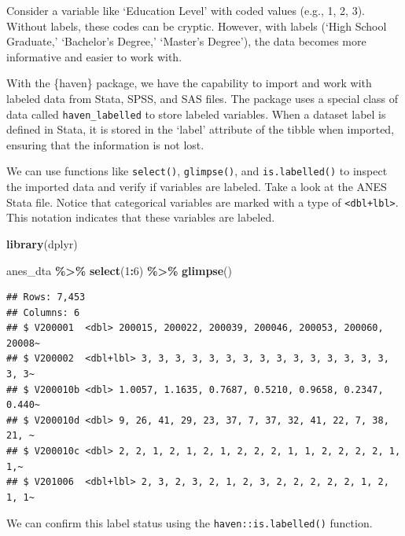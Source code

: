 \documentclass[
]{krantz}
\makeatletter
\newenvironment{Shaded}{\begin{snugshade}}{\end{snugshade}}
\newcommand{\DecValTok}[1]{\textcolor[rgb]{0.06,0.06,0.06}{#1}}
\newcommand{\FunctionTok}[1]{\textcolor[rgb]{0.27,0.27,0.27}{\textbf{#1}}}
\newcommand{\NormalTok}[1]{#1}
\newcommand{\SpecialCharTok}[1]{\textcolor[rgb]{0.43,0.43,0.43}{\textbf{#1}}}
\newenvironment{kframe}{%
\medskip{}
\setlength{\fboxsep}{.8em}
 \def\at@end@of@kframe{}%
 \ifinner\ifhmode%
  \def\at@end@of@kframe{\end{minipage}}%
  \begin{minipage}{\columnwidth}%
 \fi\fi%
 \def\FrameCommand##1{\hskip\@totalleftmargin \hskip-\fboxsep
 \colorbox{shadecolor}{##1}\hskip-\fboxsep
     \hskip-\linewidth \hskip-\@totalleftmargin \hskip\columnwidth}%
 \MakeFramed {\advance\hsize-\width
   \@totalleftmargin\z@ \linewidth\hsize
   \@setminipage}}%
 {\par\unskip\endMakeFramed%
 \at@end@of@kframe}
\renewenvironment{Shaded}{\begin{kframe}}{\end{kframe}}
\makeatother
\begin{document}
Consider a variable like `Education Level' with coded values (e.g., 1, 2, 3). Without labels, these codes can be cryptic. However, with labels (`High School Graduate,' `Bachelor's Degree,' `Master's Degree'), the data becomes more informative and easier to work with.

With the \{haven\} package, we have the capability to import and work with labeled data from Stata, SPSS, and SAS files. The package uses a special class of data called \texttt{haven\_labelled} to store labeled variables. When a dataset label is defined in Stata, it is stored in the `label' attribute of the tibble when imported, ensuring that the information is not lost.

We can use functions like \texttt{select()}, \texttt{glimpse()}, and \texttt{is.labelled()} to inspect the imported data and verify if variables are labeled. Take a look at the ANES Stata file. Notice that categorical variables are marked with a type of \texttt{\textless{}dbl+lbl\textgreater{}}. This notation indicates that these variables are labeled.

\begin{Shaded}
\begin{Highlighting}[]
\FunctionTok{library}\NormalTok{(dplyr)}

\NormalTok{anes\_dta }\SpecialCharTok{\%\textgreater{}\%}
  \FunctionTok{select}\NormalTok{(}\DecValTok{1}\SpecialCharTok{:}\DecValTok{6}\NormalTok{) }\SpecialCharTok{\%\textgreater{}\%}
  \FunctionTok{glimpse}\NormalTok{()}
\end{Highlighting}
\end{Shaded}

\begin{verbatim}
## Rows: 7,453
## Columns: 6
## $ V200001  <dbl> 200015, 200022, 200039, 200046, 200053, 200060, 20008~
## $ V200002  <dbl+lbl> 3, 3, 3, 3, 3, 3, 3, 3, 3, 3, 3, 3, 3, 3, 3, 3, 3~
## $ V200010b <dbl> 1.0057, 1.1635, 0.7687, 0.5210, 0.9658, 0.2347, 0.440~
## $ V200010d <dbl> 9, 26, 41, 29, 23, 37, 7, 37, 32, 41, 22, 7, 38, 21, ~
## $ V200010c <dbl> 2, 2, 1, 2, 1, 2, 1, 2, 2, 2, 1, 1, 2, 2, 2, 2, 1, 1,~
## $ V201006  <dbl+lbl> 2, 3, 2, 3, 2, 1, 2, 3, 2, 2, 2, 2, 2, 1, 2, 1, 1~
\end{verbatim}

We can confirm this label status using the \texttt{haven::is.labelled()} function.

\begin{Shaded}
\end{Shaded}
\end{document}
